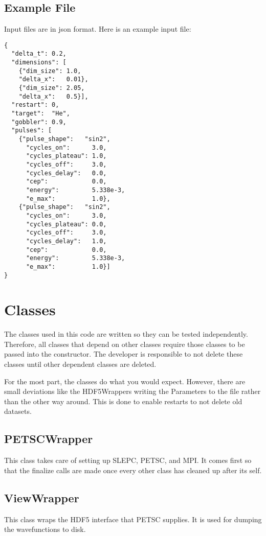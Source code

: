 \documentclass{article}
\begin{document}
\subsection{Example File} %
\label{sub:example_file}
Input files are in json format. Here is an example input file:
\begin{verbatim}
{
  "delta_t": 0.2,
  "dimensions": [
    {"dim_size": 1.0,
    "delta_x":   0.01},
    {"dim_size": 2.05,
    "delta_x":   0.5}],
  "restart": 0,
  "target":  "He",
  "gobbler": 0.9,
  "pulses": [
    {"pulse_shape":   "sin2",
      "cycles_on":      3.0,
      "cycles_plateau": 1.0,
      "cycles_off":     3.0,
      "cycles_delay":   0.0,
      "cep":            0.0,
      "energy":         5.338e-3,
      "e_max":          1.0},
    {"pulse_shape":   "sin2",
      "cycles_on":      3.0,
      "cycles_plateau": 0.0,
      "cycles_off":     3.0,
      "cycles_delay":   1.0,
      "cep":            0.0,
      "energy":         5.338e-3,
      "e_max":          1.0}]
}
\end{verbatim}




\section{Classes} %
\label{sec:classes}

The classes used in this code are written so they can be tested independently. Therefore, all classes that depend on other classes require those classes to be passed into the constructor. The developer is responsible to not delete these classes until other dependent classes are deleted.

For the most part, the classes do what you would expect. However, there are small deviations like the HDF5Wrappers writing the Parameters to the file rather than the other way around. This is done to enable restarts to not delete old datasets.

\subsection{PETSCWrapper} %
\label{sub:petscwrapper}
This class takes care of setting up SLEPC, PETSC, and MPI. It comes first so that the finalize calls are made once every other class has cleaned up after its self.

\subsection{ViewWrapper} %
\label{sub:viewwrapper}
This class wraps the HDF5 interface that PETSC supplies. It is used for dumping the wavefunctions to disk.
\end{document}

